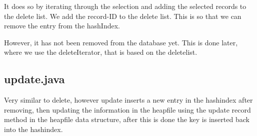 \documentclass[a4paper,10pt,titlepage]{report}
\begin{document}
It does so by iterating through the selection and adding the selected records to the delete list. We add the record-ID to the delete list. This is so that we can remove the entry from the hashIndex.

However, it has not been removed from the database yet. This is done later, where we use the deleteIterator, that is based on the deletelist.

\subsection{update.java}

Very similar to delete, however update inserts a new entry in the hashindex after removing, then updating the information in the heapfile using the update record method in the heapfile data structure, after this is done the key is inserted back into the hashindex. 
\end{document}
